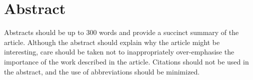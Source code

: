 \section{Abstract}
Abstracts should be up to 300 words and provide a succinct summary of the article. Although the abstract should explain why the article might be interesting, care should be taken not to inappropriately over-emphasise the importance of the work described in the article. Citations should not be used in the abstract, and the use of abbreviations should be minimized.
